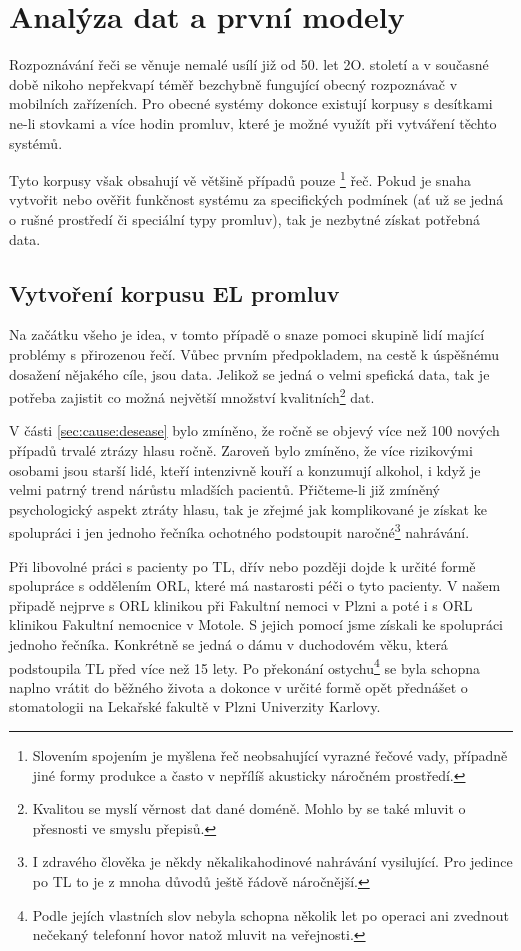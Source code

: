 \section{Analýza dat a první modely}
\label{chap:experiments:analysis}

Rozpoznávání řeči se věnuje nemalé usílí již od 50. let 2O. století a v současné době nikoho nepřekvapí téměř bezchybně fungující obecný rozpoznávač v mobilních zařízeních. Pro obecné systémy dokonce existují korpusy s desítkami ne-li stovkami a více hodin promluv, které je možné využít při vytváření těchto systémů.

Tyto korpusy však obsahují vě většině případů pouze \footnote{Slovením spojením  je myšlena řeč neobsahující vyrazné řečové vady, případně jiné formy produkce a často v nepřílíš akusticky náročném prostředí.} řeč. Pokud je snaha vytvořit nebo ověřit funkčnost systému za specifických podmínek (ať už se jedná o rušné prostředí či speciální typy promluv), tak je nezbytné získat potřebná data.

\subsection{Vytvoření korpusu EL promluv}

Na začátku všeho je idea, v tomto případě o snaze pomoci skupině lidí mající problémy s přirozenou řečí. Vůbec prvním předpokladem, na cestě k úspěšnému dosažení nějakého cíle, jsou data. Jelikož se jedná o velmi spefická data, tak je potřeba zajistit co možná největší množství kvalitních\footnote{Kvalitou se myslí věrnost dat dané doméně. Mohlo by se také mluvit o přesnosti ve smyslu přepisů.} dat.

V části \ref{sec:cause:desease} bylo zmíněno, že ročně se objevý více než 100 nových případů trvalé ztrázy hlasu ročně. Zaroveň bylo zmíněno, že více rizikovými osobami jsou starší lidé, kteří intenzivně kouří a konzumují alkohol, i když je velmi patrný trend nárůstu mladších pacientů. Přičteme-li již zmíněný psychologický aspekt ztráty hlasu, tak je zřejmé jak komplikované je získat ke spolupráci i jen jednoho řečníka ochotného podstoupit naročné\footnote{I zdravého člověka je někdy někalikahodinové nahrávání vysilující. Pro jedince po TL to je z mnoha důvodů ještě řádově náročnější.} nahrávání.

Při libovolné práci s pacienty po TL, dřív nebo později dojde k určité formě spolupráce s oddělením ORL, které má nastarosti péči o tyto pacienty. V našem připadě nejprve s ORL klinikou při Fakultní nemoci v Plzni a poté i s ORL klinikou Fakultní nemocnice v Motole. S jejich pomocí jsme získali ke spolupráci jednoho řečníka. Konkrétně se jedná o dámu v duchodovém věku, která podstoupila TL před více než 15 lety. Po překonání ostychu\footnote{Podle jejích vlastních slov nebyla schopna několik let po operaci ani zvednout nečekaný telefonní hovor natož mluvit na veřejnosti.} se byla schopna naplno vrátit do běžného života a dokonce v určité formě opět přednášet o stomatologii na Lekařské fakultě v Plzni Univerzity Karlovy.

